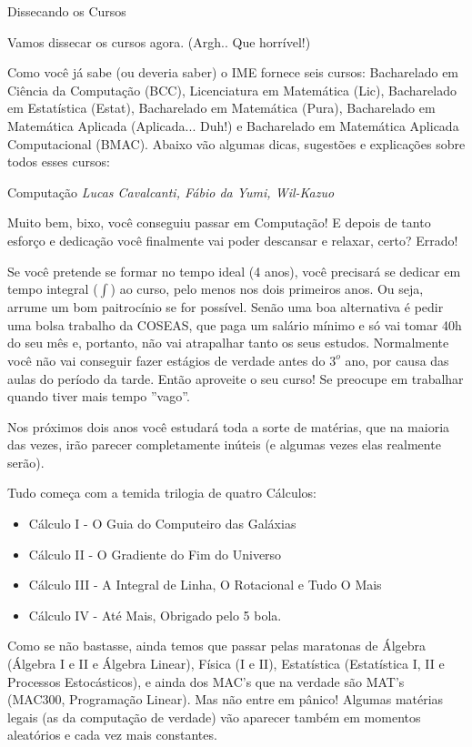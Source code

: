 \begin{secao}{Dissecando os Cursos}


Vamos dissecar os cursos agora. (Argh.. Que horrível!)

Como você já sabe (ou deveria saber) o IME fornece seis cursos: Bacharelado em
Ciência da Computação (BCC), Licenciatura em Matemática (Lic), Bacharelado em
Estatística (Estat), Bacharelado em Matemática (Pura), Bacharelado em Matemática
Aplicada (Aplicada... Duh!)  e Bacharelado em Matemática Aplicada
Computacional (BMAC). Abaixo vão algumas dicas, sugestões e explicações sobre todos
esses cursos:

\begin{subsecao}{Computação}
{\em Lucas Cavalcanti, Fábio da Yumi, Wil-Kazuo}

Muito bem, bixo, você conseguiu passar em Computação! E depois de tanto esforço e dedicação você finalmente vai poder descansar e relaxar, certo? Errado!

Se você pretende se formar no tempo ideal (4 anos), você precisará se dedicar em tempo integral ($\int$) ao curso, pelo menos nos dois primeiros anos. Ou seja, arrume um bom paitrocínio se for possível. Senão uma boa alternativa é pedir uma bolsa trabalho da COSEAS, que paga um salário mínimo e só vai tomar 40h do seu mês e, portanto, não vai atrapalhar tanto os seus estudos. Normalmente você não vai conseguir fazer estágios de verdade antes do $3^{o}$ ano, por causa das aulas do período da tarde. Então aproveite o seu curso! Se preocupe em trabalhar quando tiver mais tempo ''vago''.

Nos próximos dois anos você estudará toda a sorte de matérias, que na maioria das vezes, irão parecer completamente inúteis (e algumas vezes elas realmente serão).

Tudo começa com a temida trilogia de quatro Cálculos:
\begin{itemize}
\item Cálculo I - O Guia do Computeiro das Galáxias
\item Cálculo II - O Gradiente do Fim do Universo
\item Cálculo III - A Integral de Linha, O Rotacional e Tudo O Mais
\item Cálculo IV - Até Mais, Obrigado pelo 5 bola.
\end{itemize}

Como se não bastasse, ainda temos que passar pelas maratonas de Álgebra (Álgebra I e II e Álgebra Linear), Física (I e II), Estatística (Estatística I, II e Processos Estocásticos), e ainda dos MAC's que na verdade são MAT's (MAC300, Programação Linear). Mas não entre em pânico! Algumas matérias legais (as da computação de verdade) vão aparecer também em momentos aleatórios e cada vez mais constantes.


\end{subsecao}
\end{secao}
